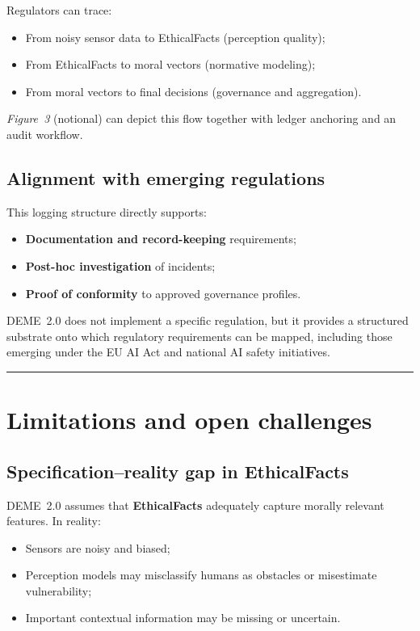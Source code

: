 \documentclass[11pt]{article}
\begin{document}
Regulators can trace:

\begin{itemize}
  \item From noisy sensor data to EthicalFacts (perception quality);
  \item From EthicalFacts to moral vectors (normative modeling);
  \item From moral vectors to final decisions (governance and aggregation).
\end{itemize}

\emph{Figure~3} (notional) can depict this flow together with ledger anchoring and an audit workflow.

\subsection{Alignment with emerging regulations}

This logging structure directly supports:

\begin{itemize}
  \item \textbf{Documentation and record-keeping} requirements;
  \item \textbf{Post-hoc investigation} of incidents;
  \item \textbf{Proof of conformity} to approved governance profiles.
\end{itemize}

DEME~2.0 does not implement a specific regulation, but it provides a structured substrate onto which regulatory requirements can be mapped, including those emerging under the EU AI Act and national AI safety initiatives.

\hrule
\vspace{1em}

\section{Limitations and open challenges}

\subsection{Specification--reality gap in EthicalFacts}

DEME~2.0 assumes that \textbf{EthicalFacts} adequately capture morally relevant features. In reality:

\begin{itemize}
  \item Sensors are noisy and biased;
  \item Perception models may misclassify humans as obstacles or misestimate vulnerability;
  \item Important contextual information may be missing or uncertain.
\end{itemize}
\end{document}
